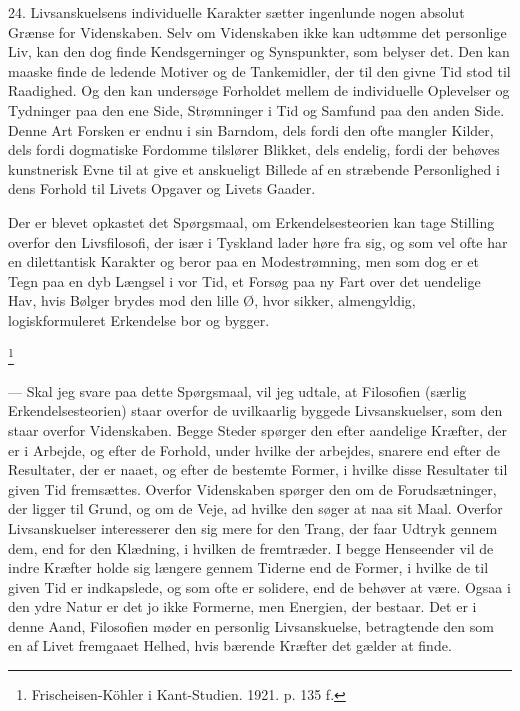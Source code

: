 \documentclass[12pt]{article}
\newcommand{\apage}[1]{\marginnote{\footnotesize\textit{[#1]}}}
\begin{document}
24. Livsanskuelsens individuelle Karakter sætter ingenlunde nogen absolut
Grænse for Videnskaben. Selv om Videnskaben ikke kan udtømme det personlige
Liv, kan den dog finde Kendsgerninger og Synspunkter, som belyser det. Den kan
maaske finde de ledende Motiver og de Tankemidler, der til den givne Tid stod
til Raadighed. Og den kan undersøge Forholdet mellem de individuelle Oplevelser
og Tydninger paa den ene Side, Strømninger i Tid og Samfund paa den anden Side.
Denne Art Forsken er endnu i sin Barndom, dels fordi den ofte mangler Kilder,
dels fordi dogmatiske Fordomme tilslører Blikket, dels endelig, fordi der
behøves kunstnerisk Evne til at give et anskueligt Billede af en stræbende
Personlighed i dens Forhold til Livets Opgaver og Livets Gaader.

Der er blevet opkastet det Spørgsmaal, om Erkendelsesteorien kan tage Stilling
overfor den \guillemotright{}Livsfilosofi\guillemotleft{}, der især i Tyskland
lader høre fra sig, og som vel ofte har en dilettantisk Karakter og beror paa
en Modestrømning, men som dog er \guillemotright{}et Tegn paa en dyb Længsel i
vor Tid\guillemotleft{}, et Forsøg paa \guillemotright{}ny Fart over det
uendelige Hav, hvis Bølger brydes mod den lille Ø, hvor sikker, almengyldig,
logiskformuleret Erkendelse bor og bygger.\guillemotleft{}

         \footnote{Frischeisen-Köhler i Kant-Studien. 1921. p. 135 f.}

       --- Skal jeg svare paa dette Spørgsmaal, vil jeg udtale, at Filosofien
(særlig Erkendelsesteorien) staar overfor de uvilkaarlig byggede
Livsanskuelser, som den staar overfor Videnskaben. Begge Steder spørger den
efter aandelige Kræfter, der er i Arbejde, og efter de Forhold, under hvilke
der arbejdes, snarere end efter de Resultater, der er naaet, og efter de
bestemte Former, i hvilke disse Resultater til given Tid
\setcounter{footnote}{0}%
\apage{76}fremsættes. Overfor Videnskaben spørger den om de Forudsætninger, der
ligger til Grund, og om de Veje, ad hvilke den søger at naa sit Maal. Overfor
Livsanskuelser interesserer den sig mere for den Trang, der faar Udtryk gennem
dem, end for den Klædning, i hvilken de fremtræder. I begge Henseender vil de
indre Kræfter holde sig længere gennem Tiderne end de Former, i hvilke de til
given Tid er indkapslede, og som ofte er solidere, end de behøver at være.
Ogsaa i den ydre Natur er det jo ikke Formerne, men Energien, der bestaar. Det
er i denne Aand, Filosofien møder en personlig Livsanskuelse, betragtende den
som en af Livet fremgaaet Helhed, hvis bærende Kræfter det gælder at finde.
\end{document}
